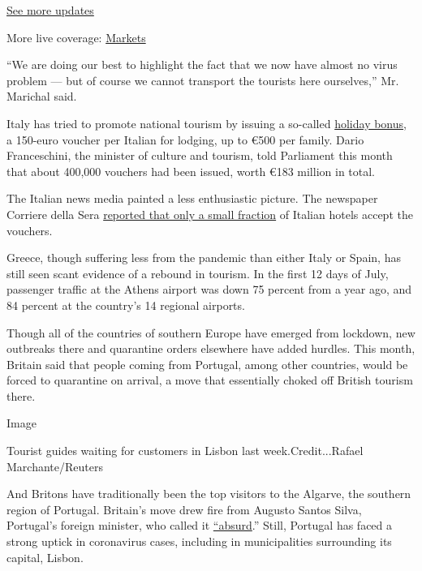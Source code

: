\href{https://www.nytimes3xbfgragh.onion/2020/08/20/world/coronavirus-covid.html?action=click\&pgtype=Article\&state=default\&region=MAIN_CONTENT_1\&context=storylines_live_updates}{See
more updates}

More live coverage:
\href{https://www.nytimes3xbfgragh.onion/live/2020/08/20/business/stock-market-today-coronavirus?action=click\&pgtype=Article\&state=default\&region=MAIN_CONTENT_1\&context=storylines_live_updates}{Markets}

``We are doing our best to highlight the fact that we now have almost no
virus problem --- but of course we cannot transport the tourists here
ourselves,'' Mr. Marichal said.

Italy has tried to promote national tourism by issuing a so-called
\href{https://www.beniculturali.it/mibac/export/MiBAC/sito-MiBAC/Contenuti/visualizza_asset.html_589930674.html}{holiday
bonus}, a 150-euro voucher per Italian for lodging, up to €500 per
family. Dario Franceschini, the minister of culture and tourism, told
Parliament this month that about 400,000 vouchers had been issued, worth
€183 million in total.

The Italian news media painted a less enthusiastic picture. The
newspaper Corriere della Sera
\href{https://www.corriere.it/politica/20_luglio_01/oggi-parte-bonus-vacanze-ma-accettano-solo-4-hotel-100-5b37220a-bb5d-11ea-8b38-f3e0b4a46805.shtml?intcmp=emailNLcor_ore12_01072020}{reported
that only a small fraction} of Italian hotels accept the vouchers.

Greece, though suffering less from the pandemic than either Italy or
Spain, has still seen scant evidence of a rebound in tourism. In the
first 12 days of July, passenger traffic at the Athens airport was down
75 percent from a year ago, and 84 percent at the country's 14 regional
airports.

Though all of the countries of southern Europe have emerged from
lockdown, new outbreaks there and quarantine orders elsewhere have added
hurdles. This month, Britain said that people coming from Portugal,
among other countries, would be forced to quarantine on arrival, a move
that essentially choked off British tourism there.

Image

Tourist guides waiting for customers in Lisbon last week.Credit...Rafael
Marchante/Reuters

And Britons have traditionally been the top visitors to the Algarve, the
southern region of Portugal. Britain's move drew fire from Augusto
Santos Silva, Portugal's foreign minister, who called it
\href{https://www.bbc.com/news/uk-53288080}{``absurd}.'' Still, Portugal
has faced a strong uptick in coronavirus cases, including in
municipalities surrounding its capital, Lisbon.


